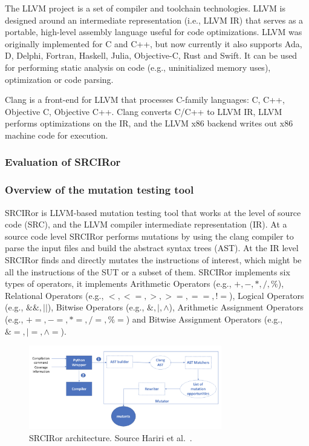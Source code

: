 The LLVM project is a set of compiler and toolchain technologies. LLVM is designed around an intermediate representation (i.e., LLVM IR) that serves as a portable, high-level assembly language useful for code optimizations. LLVM was originally implemented for C and C++, but now currently it also supports Ada, D, Delphi, Fortran, Haskell, Julia, Objective-C, Rust and Swift. It can be used for performing static analysis on code (e.g., uninitialized memory uses), optimization or code parsing.

Clang is a front-end for LLVM that processes C-family languages: C, C++, Objective C, Objective C++. Clang converts C/C++ to LLVM IR, LLVM performs optimizations on the IR, and the LLVM x86 backend writes out x86 machine code for execution.

\subsubsection{Evaluation of SRCIRor}
\label{subsec:srciror}

\subsubsection{Overview of the mutation testing tool}

SRCIRor is LLVM-based mutation testing tool that works at the level of source code (SRC), and the LLVM compiler intermediate representation (IR).
At a source code level SRCIRor performs mutations by using the clang compiler to parse the input files and build the abstract syntax trees (AST).
At the IR level SRCIRor finds and directly mutates the instructions of interest, which might be all the instructions of the SUT or a subset of them.
SRCIRor implements six types of operators, it implements Arithmetic Operators (e.g., $+, -, *, /, \%$), Relational Operators (e.g., $<, <=, >, >=, ==, !=$), Logical Operators (e.g., $\&\&, ||$), Bitwise Operators (e.g., $\&, |, \wedge$), Arithmetic Assignment Operators (e.g., $+=, -=, *=, /=, \%=$) and Bitwise Assignment Operators (e.g., $\&=, |=, \wedge=$).

\begin{figure}[h]
	\centering
    \includegraphics[width=0.75\textwidth]{images/srciror_arch}
    \caption{SRCIRor architecture. Source Hariri et al.~\cite{hariri2018srciror}.}
    \label{fig:srciror_arch}
\end{figure}

